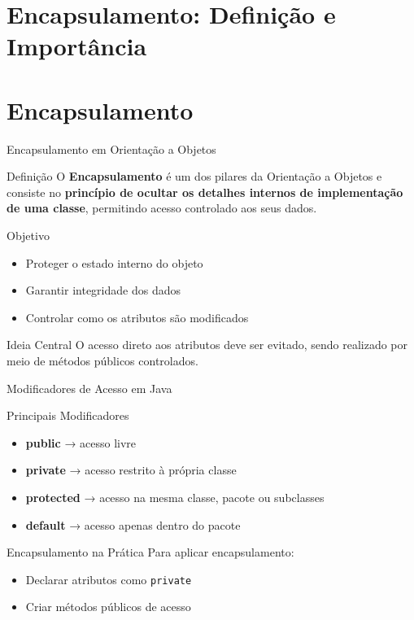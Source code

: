 \documentclass[9pt]{beamer}
\begin{document}
\section{Encapsulamento: Definição e Importância}
\section{Encapsulamento}

\begin{frame}{Encapsulamento em Orientação a Objetos}

\begin{block}{Definição}
O \textbf{Encapsulamento} é um dos pilares da Orientação a Objetos e consiste no
\textbf{princípio de ocultar os detalhes internos de implementação de uma classe},
permitindo acesso controlado aos seus dados.
\end{block}

\begin{block}{Objetivo}
\begin{itemize}
    \item Proteger o estado interno do objeto
    \item Garantir integridade dos dados
    \item Controlar como os atributos são modificados
\end{itemize}
\end{block}

\begin{block}{Ideia Central}
O acesso direto aos atributos deve ser evitado,
sendo realizado por meio de métodos públicos controlados.
\end{block}

\end{frame}
\begin{frame}{Modificadores de Acesso em Java}

\begin{block}{Principais Modificadores}
\begin{itemize}
    \item \textbf{public} → acesso livre
    \item \textbf{private} → acesso restrito à própria classe
    \item \textbf{protected} → acesso na mesma classe, pacote ou subclasses
    \item \textbf{default} → acesso apenas dentro do pacote
\end{itemize}
\end{block}

\begin{block}{Encapsulamento na Prática}
Para aplicar encapsulamento:
\begin{itemize}
    \item Declarar atributos como \texttt{private}
    \item Criar métodos públicos de acesso
\end{itemize}
\end{block}

\end{frame}
\end{document}

